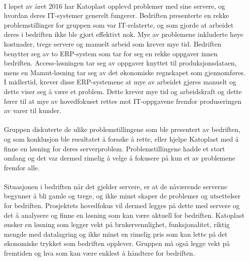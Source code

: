 \paragraph{} I løpet av året 2016 har Katoplast opplevd problemer med sine servere, og hvordan deres IT-systemer generelt fungerer. Bedriften presenterte en rekke problemstillinger for gruppen som var IT-relaterte, og som gjorde at arbeidet deres i bedriften ikke ble gjort effektivt nok. Mye av problemene inkluderte høye kostnader, trege servere og manuelt arbeid som krever mye tid. Bedriften benytter seg av to ERP-system som tar for seg en rekke oppgaver innen bedriften. Access-løsningen tar seg av oppgaver knyttet til produksjonsdataen, mens en Mamut-løsning tar seg av det økonomiske regnskapet som gjennomføres. I midlertid, krever disse ERP-systemene at mye av arbeidet gjøres manuelt og dette viser seg å være et problem. Dette krever mye tid og arbeidskraft og dette fører til at mye av hovedfokuset rettes mot IT-oppgavene fremfor produseringen av varer til kunder.

\paragraph{}Gruppen diskuterte de ulike problemstillingene som ble presentert av bedriften, og som konklusjon ble resultatet å forsøke å rette, eller hjelpe Katoplast med å finne en løsning for deres serverproblem. Problemstillingene hadde et stort omfang og det var dermed rimelig å velge å fokusere på kun et av problemene fremfor alle.

\paragraph{}Situasjonen i bedriften når det gjelder servere, er at de nåværende serverne begynner å bli gamle og trege, og ikke minst skaper de problemer og utsettelser for bedriften. Prosjektets hovedfokus vil dermed legges på dette med servere og det å analysere og finne en løsning som kan være aktuell for bedriften. Katoplast ønsker en løsning som legger vekt på brukervennlighet, funksjonalitet, riktig mengde med datalagring og ikke minst en rimelig pris som kan lette på det økonomiske trykket som bedriften opplever. Gruppen må også legge vekt på fremtiden og hva som kan være enklest å håndtere for bedriften.

